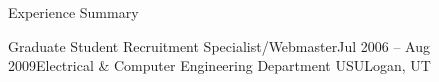 \begin{rSection}{Experience Summary}
\begin{rExperienceHeader}{Graduate Student Recruitment Specialist/Webmaster}{Jul 2006 -- Aug 2009}{Electrical \& Computer Engineering Department USU}{Logan, UT}
\end{rExperienceHeader}
%
%
%
%
%
%
%

\end{rSection}
